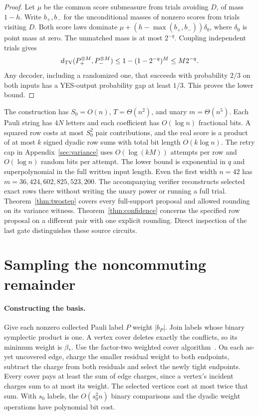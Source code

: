 \documentclass[11pt]{article}
\begin{document}
\begin{proof}
Let \(\mu\) be the common score submeasure from trials avoiding \(D\), of mass \(1-h\). Write \(b_+,b_-\) for the unconditional masses of nonzero scores from trials visiting \(D\). Both score laws dominate \(\mu+(h-\max(b_+,b_-))\delta_0\), where \(\delta_0\) is point mass at zero. The unmatched mass is at most \(2^{-q}\). Coupling independent trials gives
\[
 d_{\rm TV}(P_+^{\otimes M},P_-^{\otimes M})
 \le 1-(1-2^{-q})^M\le M2^{-q}.
\]
Any decoder, including a randomized one, that succeeds with probability \(2/3\) on both inputs has a YES-output probability gap at least \(1/3\). This proves the lower bound.
\end{proof}

The construction has \(S_0=O(n)\), \(T=\Theta(n^2)\), and unary \(m=\Theta(n^5)\). Each Pauli string has \(4N\) letters and each coefficient has \(O(\log n)\) fractional bits. A squared row costs at most \(S_0^2\) pair contributions, and the real score is a product of at most \(k\) signed dyadic row sums with total bit length \(O(k\log n)\). The retry cap in Appendix~\ref{sec:variance} uses \(O(\log(kM))\) attempts per row and \(O(\log n)\) random bits per attempt. The lower bound is exponential in \(q\) and superpolynomial in the full written input length. Even the first width \(n=42\) has \(m=36{,}424{,}602{,}825{,}523{,}200\). The accompanying verifier reconstructs selected exact rows there without writing the unary power or running a full trial. Theorem~\ref{thm:twostep} covers every full-support proposal and allowed rounding on its variance witness. Theorem~\ref{thm:confidence} concerns the specified row proposal on a different pair with one explicit rounding. Direct inspection of the last gate distinguishes these source circuits.

\section{Sampling the noncommuting remainder}\label{sec:remainder}

\paragraph{Constructing the basis.}
Give each nonzero collected Pauli label \(P\) weight \(|b_P|\). Join labels whose binary symplectic product is one. A vertex cover deletes exactly the conflicts, so its minimum weight is \(\beta_*\). Use the factor-two weighted cover algorithm~\cite{cover}. On each as-yet uncovered edge, charge the smaller residual weight to both endpoints, subtract the charge from both residuals and select the newly tight endpoints. Every cover pays at least the sum of edge charges, since a vertex's incident charges sum to at most its weight. The selected vertices cost at most twice that sum. With \(s_0\) labels, the \(O(s_0^2 n)\) binary comparisons and the dyadic weight operations have polynomial bit cost.
\end{document}
